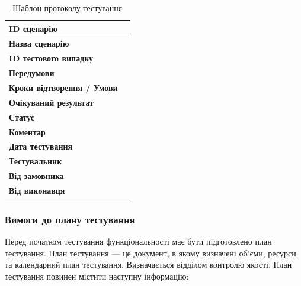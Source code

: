 \documentclass{article}
\begin{document}
\begin{table}[htbp]
\centering
\caption{Шаблон протоколу тестування}
\label{tab:protocol_template}
\begin{tabular}{|l|l|}
\hline
\textbf{ID сценарію} & \\
\hline
\textbf{Назва сценарію} & \\
\hline
\textbf{ID тестового випадку} & \\
\hline
\textbf{Передумови} & \\
\hline
\textbf{Кроки відтворення / Умови} & \\
\hline
\textbf{Очікуваний результат} & \\
\hline
\textbf{Статус} & \\
\hline
\textbf{Коментар} & \\
\hline
\textbf{Дата тестування} & \\
\hline
\textbf{Тестувальник} & \\
\hline
\textbf{Від замовника} & \\
\hline
\textbf{Від виконавця} & \\
\hline
\end{tabular}
\end{table}

\newpage


\subsubsection{Вимоги до плану тестування}

Перед початком тестування функціональності має бути підготовлено план тестування.
План тестування — це документ, в якому визначені об’єми, ресурси та календарний
план тестування. Визначається відділом контролю якості.
План тестування повинен містити наступну інформацію:
\end{document}
